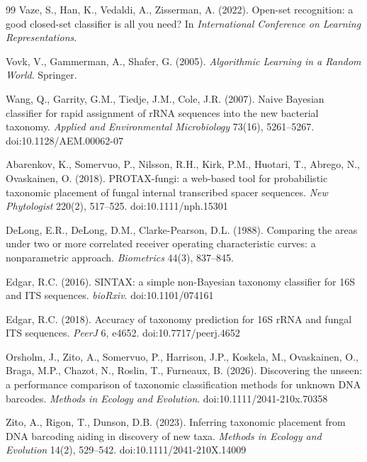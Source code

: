 \documentclass[11pt]{article}
\begin{document}
\begin{thebibliography}{99}
Vaze, S., Han, K., Vedaldi, A., Zisserman, A. (2022). Open-set recognition: a
good closed-set classifier is all you need? In \emph{International Conference on
Learning Representations}.

Vovk, V., Gammerman, A., Shafer, G. (2005). \emph{Algorithmic Learning in a
Random World}. Springer.

Wang, Q., Garrity, G.M., Tiedje, J.M., Cole, J.R. (2007). Naive Bayesian
classifier for rapid assignment of rRNA sequences into the new bacterial
taxonomy. \emph{Applied and Environmental Microbiology} 73(16), 5261--5267.
doi:10.1128/AEM.00062-07


Abarenkov, K., Somervuo, P., Nilsson, R.H., Kirk, P.M., Huotari, T., Abrego, N.,
Ovaskainen, O. (2018). PROTAX-fungi: a web-based tool for probabilistic taxonomic
placement of fungal internal transcribed spacer sequences. \emph{New Phytologist}
220(2), 517--525. doi:10.1111/nph.15301

DeLong, E.R., DeLong, D.M., Clarke-Pearson, D.L. (1988). Comparing the areas
under two or more correlated receiver operating characteristic curves: a
nonparametric approach. \emph{Biometrics} 44(3), 837--845.

Edgar, R.C. (2016). SINTAX: a simple non-Bayesian taxonomy classifier for 16S and
ITS sequences. \emph{bioRxiv}. doi:10.1101/074161

Edgar, R.C. (2018). Accuracy of taxonomy prediction for 16S rRNA and fungal ITS
sequences. \emph{PeerJ} 6, e4652. doi:10.7717/peerj.4652

Orsholm, J., Zito, A., Somervuo, P., Harrison, J.P., Koskela, M., Ovaskainen, O.,
Braga, M.P., Chazot, N., Roslin, T., Furneaux, B. (2026). Discovering the unseen:
a performance comparison of taxonomic classification methods for unknown DNA
barcodes. \emph{Methods in Ecology and Evolution}. doi:10.1111/2041-210x.70358

Zito, A., Rigon, T., Dunson, D.B. (2023). Inferring taxonomic placement from DNA
barcoding aiding in discovery of new taxa. \emph{Methods in Ecology and
Evolution} 14(2), 529--542. doi:10.1111/2041-210X.14009

\end{thebibliography}
\end{document}
